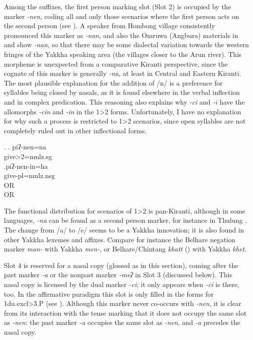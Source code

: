  
Among the suffixes, the first person marking slot (Slot 2) is occupied by the marker \emph{-nen}, coding all and only those scenarios where  the first person acts on the second person (see \Next). A speaker from Hombong  village consistently pronounced this marker as \emph{-nan}, and also the Omruwa (Angbura) materials in \citet{Driem1994The-Yakkha} and  \citet{Gvozdanovic1987How} show \emph{-nan}, so that there may be some dialectal variation towards the western fringes of the Yakkha speaking area (the villages closer to the Arun river). This morpheme is unexpected from a comparative Kiranti perspective, since the cognate of this marker is generally  \emph{-na}, at least in Central and Eastern Kiranti. The most plausible explanation for the addition of /n/ is  a preference for  syllables being closed by nasals, as it is found elsewhere in the verbal inflection and in complex predication. This reasoning also explains why \emph{-ci} and \emph{-i} have the allomorphs \emph{-cin} and \emph{-in} in the 1>2 forms.  Unfortunately, I have no explanation for why such a process is  restricted to 1>2 scenarios, since open syllables are not completely ruled out in other inflectional forms.


\ex. \ag. piʔ-nen=na\\
	give{>2=nmlz.sg}\\
	\bg.\label{ex-nenin}piʔ-nen-in=ha\\
	give{\sc [pst]-pl=nmlz.nsg}\\
	 OR\\
	 OR\\

The functional distribution for scenarios of 1>2 is  pan-Kiranti, although in some languages, \emph{-na} can be found as a second person marker, for instance in Thulung \citep[148]{Lahaussois2002Thulung}. The change from /a/ to /e/ seems to be a Yakkha innovation; it is also found in other Yakkha lexemes and affixes. Compare for instance the Belhare negation marker \emph{man-} with Yakkha \emph{men-}, or Belhare/Chintang \emph{khatt} () with Yakkha \emph{khet}. 
	


Slot 4 is reserved for a nasal copy (glossed as {\sc [copy]} in this section), coming after the past marker  \emph{-a} or the nonpast marker \emph{-meʔ} in Slot 3 (discussed below). This nasal copy is licensed by the dual marker \emph{-ci}; it only appears  when \emph{-ci} is there, too. In the affirmative paradigm this slot is only filled in the forms for {\sc 1du.excl>3.P} (see \Next). Although this marker never co-occurs with \emph{-nen}, it is clear from its interaction with the tense marking that it does not occupy the same slot as \emph{-nen}: the past marker \emph{-a} occupies the same slot as \emph{-nen}, and \emph{-a} precedes the nasal copy.

